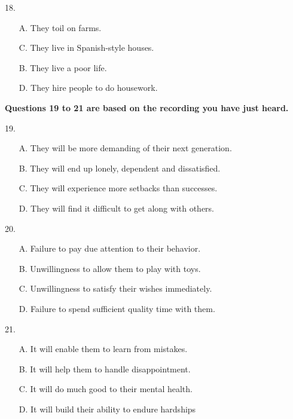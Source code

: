 \documentclass[UTF8,11pt]{ctexart}
\begin{document}
18.


\begin{itemize}[leftmargin=2em,itemsep=.2em,topsep=.4em]\item[A.] They toil on farms.
\item[C.] They live in Spanish-style houses.
\end{itemize}

\begin{itemize}[leftmargin=2em,itemsep=.2em,topsep=.4em]\item[B.] They live a poor life.
\item[D.] They hire people to do housework.
\end{itemize}

\textbf{Questions 19 to 21 are based on the recording you have just heard.}


19.


\begin{itemize}[leftmargin=2em,itemsep=.2em,topsep=.4em]\item[A.] They will be more demanding of their next generation.
\item[B.] They will end up lonely, dependent and dissatisfied.
\item[C.] They will experience more setbacks than successes.
\item[D.] They will find it difficult to get along with others.
\end{itemize}

20.


\begin{itemize}[leftmargin=2em,itemsep=.2em,topsep=.4em]\item[A.] Failure to pay due attention to their behavior.
\item[B.] Unwillingness to allow them to play with toys.
\item[C.] Unwillingness to satisfy their wishes immediately.
\item[D.] Failure to spend sufficient quality time with them.
\end{itemize}

21.


\begin{itemize}[leftmargin=2em,itemsep=.2em,topsep=.4em]\item[A.] It will enable them to learn from mistakes.
\item[B.] It will help them to handle disappointment.
\item[C.] It will do much good to their mental health.
\item[D.] It will build their ability to endure hardships
\end{itemize}
\end{document}
